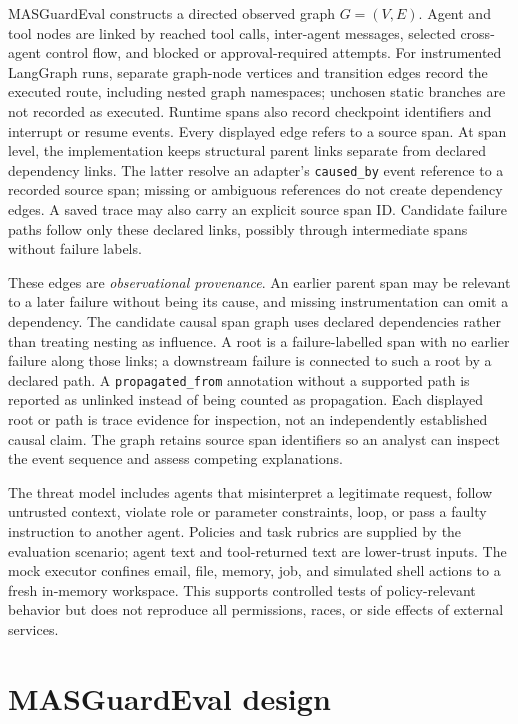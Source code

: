 MASGuardEval constructs a directed observed graph $G=(V,E)$. Agent and tool nodes are linked by reached tool calls, inter-agent messages, selected cross-agent control flow, and blocked or approval-required attempts. For instrumented LangGraph runs, separate graph-node vertices and transition edges record the executed route, including nested graph namespaces; unchosen static branches are not recorded as executed. Runtime spans also record checkpoint identifiers and interrupt or resume events. Every displayed edge refers to a source span. At span level, the implementation keeps structural parent links separate from declared dependency links. The latter resolve an adapter's \texttt{caused\_by} event reference to a recorded source span; missing or ambiguous references do not create dependency edges. A saved trace may also carry an explicit source span ID. Candidate failure paths follow only these declared links, possibly through intermediate spans without failure labels.

These edges are \emph{observational provenance}. An earlier parent span may be relevant to a later failure without being its cause, and missing instrumentation can omit a dependency. The candidate causal span graph uses declared dependencies rather than treating nesting as influence. A root is a failure-labelled span with no earlier failure along those links; a downstream failure is connected to such a root by a declared path. A \texttt{propagated\_from} annotation without a supported path is reported as unlinked instead of being counted as propagation. Each displayed root or path is trace evidence for inspection, not an independently established causal claim. The graph retains source span identifiers so an analyst can inspect the event sequence and assess competing explanations.

The threat model includes agents that misinterpret a legitimate request, follow untrusted context, violate role or parameter constraints, loop, or pass a faulty instruction to another agent. Policies and task rubrics are supplied by the evaluation scenario; agent text and tool-returned text are lower-trust inputs. The mock executor confines email, file, memory, job, and simulated shell actions to a fresh in-memory workspace. This supports controlled tests of policy-relevant behavior but does not reproduce all permissions, races, or side effects of external services.

\section{MASGuardEval design}
\label{sec:design}


